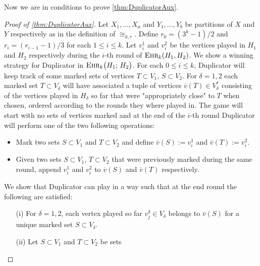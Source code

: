 \documentclass[12pt,notitlepage,a4paper]{article}
\theoremstyle{definition}
\newcommand{\ehr}{\textsc{Ehr}}
\begin{document}
Now we are in conditions to prove \cref{thm:DuplicatorAux}.





\begin{proof}[Proof of \cref{thm:DuplicatorAux}]
	Let $X_1,\dots,X_a$ and 
	$Y_1,\dots,Y_b$ be partitions of 
	$X$ and $Y$ respectively
	as in the definition of $\cong_{k,r}$.
	Define $r_0=(3^k-1)/2$ and $r_i=(r_{i-1}-1)/3$ for each
	$1\leq i \leq k$. 
	Let $v^1_i$ and $v^2_i$ be the vertices played
	in $H_1$ and $H_2$ respectively during the $i$-th
	round of $\ehr_k(H_1,H_2)$. 
	We show a winning strategy for Duplicator
	in $\ehr_{k}\big(H_1;\, H_2\big)$. For each $0\leq i \leq k$,
	Duplicator will	keep track of some marked sets 
	of vertices $T\subset V_1$, $S\subset V_2$. 
	For $\delta=1,2$ each marked set
	$T\subset V_\delta$ will have associated a tuple
	of vertices $\overline{v}(T)\in V_\delta^*$ consisting
	of the vertices played in $H_\delta$ so far that were 
	"appropriately close" to $T$ when chosen,  ordered according
	to the rounds they where played in.
	The game will start with no sets of vertices marked and 
	at the end of the $i$-th
	round Duplicator will perform one of the two
	following operations:
	\begin{itemize}
	\item Mark two sets $S\subset V_1$ and $T\subset V_2$ and
	define $\overline{v}(S):=v^1_i$ and $\overline{v}(T):=v^2_i$.
	\item Given two sets $S\subset V_1$, $T\subset V_2$ that were 
	previously marked during the same round, append $v^1_i$
	and $v^2_i$ to $\overline{v}(S)$ and $\overline{v}(T)$ 
	respectively. 
	\end{itemize}
	We show that Duplicator can play in a way such that at the
	end round the following are satisfied:
	\begin{itemize}
		\item[(i)] For $\delta=1,2$, each vertex played
		so far $v^\delta_j\in V_\delta$ belongs to 
		$\overline{v}(S)$ for a	 unique marked set 
		$S\subset V_\delta$.
		\item[(ii)] Let $S\subset V_1$ and $T\subset V_2$ be sets

\end{itemize}
\end{proof}
\end{document}
